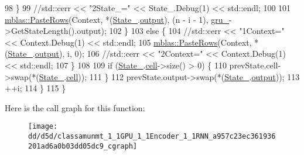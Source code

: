 \begin{DoxyCode}
98               \}
99               \textcolor{comment}{//std::cerr << "2State\_=" << State\_.Debug(1) << std::endl;}
100 
101               \hyperlink{namespaceamunmt_1_1GPU_1_1mblas_aea9adf68efb5a26cb9bca66189c1786c}{mblas::PasteRows}(Context, *(\hyperlink{classamunmt_1_1GPU_1_1Encoder_1_1RNN_a2c27e8bf2554193cd582200e7e6fed12}{State\_}.\hyperlink{structamunmt_1_1GPU_1_1CellState_ac2d94a4fd199fe8458529a075b9df1b7}{output}), (n - i - 1), 
      \hyperlink{classamunmt_1_1GPU_1_1Encoder_1_1RNN_acd6ef602484ab71138e4f49ab8b75c67}{gru\_}->GetStateLength().output);
102             \}
103             \textcolor{keywordflow}{else} \{
104               \textcolor{comment}{//std::cerr << "1Context=" << Context.Debug(1) << std::endl;}
105               \hyperlink{namespaceamunmt_1_1GPU_1_1mblas_aea9adf68efb5a26cb9bca66189c1786c}{mblas::PasteRows}(Context, *(\hyperlink{classamunmt_1_1GPU_1_1Encoder_1_1RNN_a2c27e8bf2554193cd582200e7e6fed12}{State\_}.\hyperlink{structamunmt_1_1GPU_1_1CellState_ac2d94a4fd199fe8458529a075b9df1b7}{output}), i, 0);
106               \textcolor{comment}{//std::cerr << "2Context=" << Context.Debug(1) << std::endl;}
107             \}
108 
109             \textcolor{keywordflow}{if} (\hyperlink{classamunmt_1_1GPU_1_1Encoder_1_1RNN_a2c27e8bf2554193cd582200e7e6fed12}{State\_}.\hyperlink{structamunmt_1_1GPU_1_1CellState_a3d8d1a31845d19b6b635b0a99029e21a}{cell}->size() > 0) \{
110               prevState.cell->swap(*(\hyperlink{classamunmt_1_1GPU_1_1Encoder_1_1RNN_a2c27e8bf2554193cd582200e7e6fed12}{State\_}.\hyperlink{structamunmt_1_1GPU_1_1CellState_a3d8d1a31845d19b6b635b0a99029e21a}{cell}));
111             \}
112             prevState.output->swap(*(\hyperlink{classamunmt_1_1GPU_1_1Encoder_1_1RNN_a2c27e8bf2554193cd582200e7e6fed12}{State\_}.\hyperlink{structamunmt_1_1GPU_1_1CellState_ac2d94a4fd199fe8458529a075b9df1b7}{output}));
113             ++i;
114           \}
115         \}
\end{DoxyCode}


Here is the call graph for this function\+:
\nopagebreak
\begin{figure}[H]
\begin{center}
\leavevmode
\texttt{[image: dd/d5d/classamunmt\_1\_1GPU\_1\_1Encoder\_1\_1RNN\_a957c23ec361936201ad6a0b03dd05dc9\_cgraph]}
\end{center}
\end{figure}


